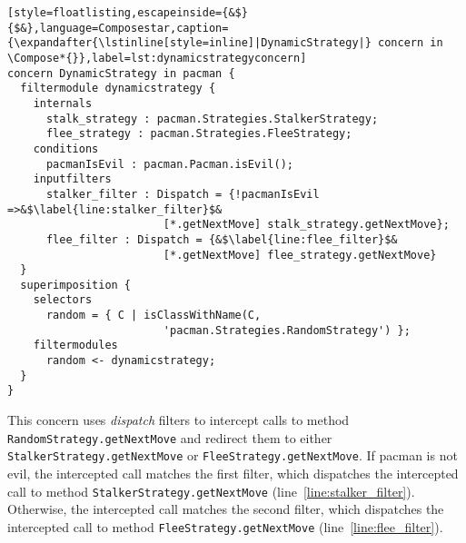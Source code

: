 \begin{lstlisting}[style=floatlisting,escapeinside={&$}{$&},language=Composestar,caption={\expandafter{\lstinline[style=inline]|DynamicStrategy|} concern in \Compose*{}},label=lst:dynamicstrategyconcern]
concern DynamicStrategy in pacman {
  filtermodule dynamicstrategy {
    internals
      stalk_strategy : pacman.Strategies.StalkerStrategy;
      flee_strategy : pacman.Strategies.FleeStrategy;   
    conditions
      pacmanIsEvil : pacman.Pacman.isEvil();
    inputfilters
      stalker_filter : Dispatch = {!pacmanIsEvil =>&$\label{line:stalker_filter}$&
                        [*.getNextMove] stalk_strategy.getNextMove};
      flee_filter : Dispatch = {&$\label{line:flee_filter}$&
                        [*.getNextMove] flee_strategy.getNextMove}
  }
  superimposition {
    selectors
      random = { C | isClassWithName(C,
                        'pacman.Strategies.RandomStrategy') };
    filtermodules
      random <- dynamicstrategy;
  }
}
\end{lstlisting}

This concern uses \emph{dispatch} filters to intercept calls to method \lstinline|RandomStrategy.getNextMove| and redirect them to either \lstinline|StalkerStrategy.getNextMove| or \lstinline|FleeStrategy.getNextMove|.
If pacman is not evil, the intercepted call matches the first filter, which dispatches the intercepted call to method \lstinline|StalkerStrategy.getNextMove| (line~\ref{line:stalker_filter}).
Otherwise, the intercepted call matches the second filter, which dispatches the intercepted call to method \lstinline|FleeStrategy.getNextMove| (line~\ref{line:flee_filter}).

